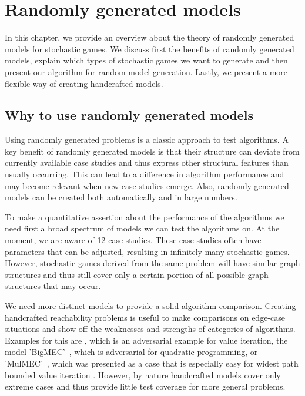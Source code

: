 \chapter{Randomly generated models} \label{ch:randomGen}
In this chapter, we provide an overview about the theory of randomly generated models for stochastic games.
We discuss first the benefits of randomly generated models, explain which types of stochastic games we want to generate and then present our algorithm for random model generation.
Lastly, we present a more flexible way of creating handcrafted models.

\section{Why to use randomly generated models} \label{sec:WhyRandomGen}
Using randomly generated problems is a classic approach to test algorithms.
A key benefit of randomly generated models is that their structure can deviate from currently available case studies 
and thus express other structural features than usually occurring. 
This can lead to a difference in algorithm performance and may become relevant when new case studies emerge.
Also, randomly generated models can be created both automatically and in large numbers.

To make a quantitative assertion about the performance of the algorithms we need first a broad spectrum of models we can test the algorithms on.
At the moment, we are aware of 12 case studies.
These case studies often have parameters that can be adjusted, resulting in infinitely many stochastic games.
However, stochastic games derived from the same problem will have similar graph structures and thus still cover only a certain portion
of all possible graph structures that may occur.

We need more distinct models to provide a solid algorithm comparison.
Creating handcrafted reachability problems is useful to make comparisons on edge-case situations and 
show off the weaknesses and strengths of categories of algorithms. Examples for this are \cite{haddadmonmege}, which is an adversarial example for
value iteration, the model 'BigMEC'~\cite{gandalf}, which is adversarial for quadratic programming, or 'MulMEC'~\cite{gandalf}, which was presented as
a case that is especially easy for widest path bounded value iteration \cite{widestPath}.
However, by nature handcrafted models cover only extreme cases and thus provide little test coverage for more general problems.

